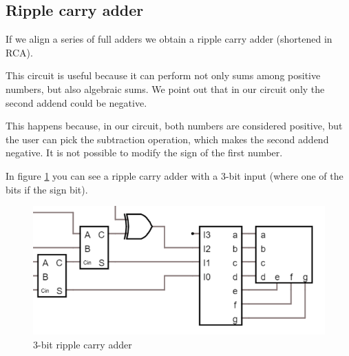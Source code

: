 \documentclass{article}
\begin{document}
\subsection{Ripple carry adder} \label{RCA_Section}

If we align a series of full adders we obtain a ripple carry adder (shortened in RCA).

\vspace{3mm}

This circuit is useful because it can perform not only sums among positive numbers, but also algebraic sums. We point out that in our circuit only the second addend could be negative.

\vspace{3mm}

This happens because, in our circuit, both numbers are considered positive, but the user can pick the subtraction operation, which makes the second addend negative. It is not possible to modify the sign of the first number.

\vspace{3mm}

In figure \ref{RCA_SMALL} you can see a ripple carry adder with a 3-bit input (where one of the bits if the sign bit).

\begin{figure}[h]
  \centering
  \includegraphics[scale=.4]{IM_RCA_SMALL.PNG}
  \caption{3-bit ripple carry adder}
  \label{RCA_SMALL}
\end{figure}






\begin{table}
  
\end{table}
\end{document}
